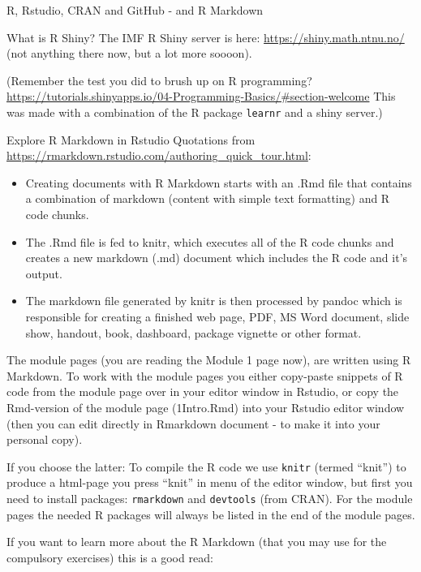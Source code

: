 \documentclass[
  ignorenonframetext,
]{beamer}
\providecommand{\tightlist}{%
  \setlength{\itemsep}{0pt}\setlength{\parskip}{0pt}}
\begin{document}
\begin{frame}[fragile]
\begin{block}{R, Rstudio, CRAN and GitHub - and R Markdown}
\begin{block}{What is R Shiny?}
The IMF R Shiny server is here: \url{https://shiny.math.ntnu.no/} (not
anything there now, but a lot more soooon).

(Remember the test you did to brush up on R programming?
\url{https://tutorials.shinyapps.io/04-Programming-Basics/\#section-welcome}
This was made with a combination of the R package \texttt{learnr} and a
shiny server.)
\end{block}
\end{block}
\end{frame}

\begin{frame}[fragile]
\begin{block}{Explore R Markdown in Rstudio}
\protect\hypertarget{explore-r-markdown-in-rstudio}{}
Quotations from
\url{https://rmarkdown.rstudio.com/authoring_quick_tour.html}:

\begin{itemize}
\tightlist
\item
  Creating documents with R Markdown starts with an .Rmd file that
  contains a combination of markdown (content with simple text
  formatting) and R code chunks.
\item
  The .Rmd file is fed to knitr, which executes all of the R code chunks
  and creates a new markdown (.md) document which includes the R code
  and it's output.
\item
  The markdown file generated by knitr is then processed by pandoc which
  is responsible for creating a finished web page, PDF, MS Word
  document, slide show, handout, book, dashboard, package vignette or
  other format.
\end{itemize}

The module pages (you are reading the Module 1 page now), are written
using R Markdown. To work with the module pages you either copy-paste
snippets of R code from the module page over in your editor window in
Rstudio, or copy the Rmd-version of the module page (1Intro.Rmd) into
your Rstudio editor window (then you can edit directly in Rmarkdown
document - to make it into your personal copy).

If you choose the latter: To compile the R code we use \texttt{knitr}
(termed ``knit'') to produce a html-page you press ``knit'' in menu of
the editor window, but first you need to install packages:
\texttt{rmarkdown} and \texttt{devtools} (from CRAN). For the module
pages the needed R packages will always be listed in the end of the
module pages.

If you want to learn more about the R Markdown (that you may use for the
compulsory exercises) this is a good read:


\end{block}
\end{frame}
\end{document}

